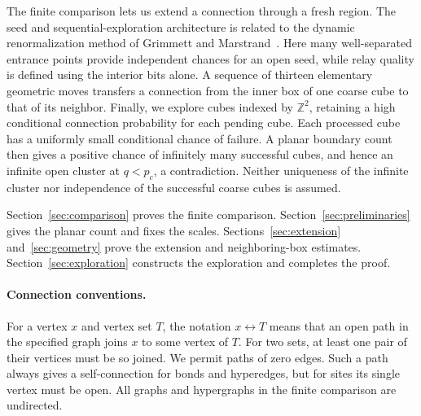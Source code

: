 The finite comparison lets us extend a connection through a fresh region.
The seed and sequential-exploration architecture is related to the dynamic
renormalization method of Grimmett and Marstrand~\cite[Sections~3--4]{GrimmettMarstrand1990}.
Here many well-separated entrance points provide independent chances for an
open seed, while relay quality is defined using the interior bits alone. A
sequence of thirteen elementary geometric moves transfers a connection from
the inner box of one coarse cube to that of its neighbor. Finally, we explore
cubes indexed by $\mathbb Z^2$, retaining a high conditional connection
probability for each pending cube. Each processed cube has a uniformly small
conditional chance of failure. A planar boundary count then gives a positive
chance of infinitely many successful cubes, and hence an infinite open
cluster at $q<p_c$, a contradiction. Neither uniqueness of the infinite
cluster nor independence of the successful coarse cubes is assumed.

Section~\ref{sec:comparison} proves the finite comparison.
Section~\ref{sec:preliminaries} gives the planar count and fixes the scales.
Sections~\ref{sec:extension} and~\ref{sec:geometry} prove the extension
and neighboring-box estimates. Section~\ref{sec:exploration} constructs
the exploration and completes the proof.

\paragraph{Connection conventions.}
For a vertex $x$ and vertex set $T$, the notation $x\leftrightarrow T$
means that an open path in the specified graph joins $x$ to some vertex of
$T$. For two sets, at least one pair of their vertices must be so joined.
We permit paths of zero edges. Such a path always gives a self-connection
for bonds and hyperedges, but for sites its single vertex must be open.
All graphs and hypergraphs in the finite comparison are undirected.
